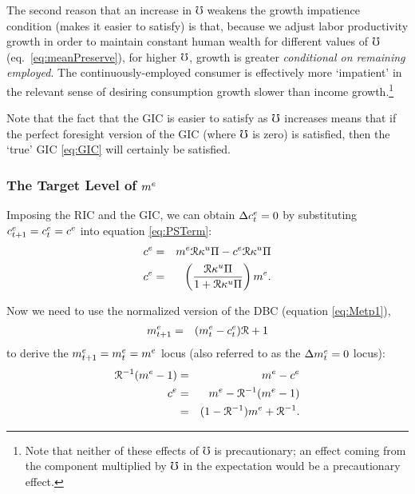 \documentclass{handout}
\begin{document}
The second reason that an increase in $\mho$ weakens the growth impatience condition (makes it 
easier to satisfy) is that, because we adjust labor productivity growth in
order to maintain constant human wealth for different values of
$\mho$ (eq.\ \eqref{eq:meanPreserve}), for higher
$\mho$, growth is greater {\it conditional on
  remaining employed}. The continuously-employed consumer is effectively
more `impatient' in the relevant sense of desiring consumption growth
slower than income growth.\footnote{Note that neither of these effects of $\mho$
  is precautionary; an effect coming from the component
  multiplied by $\mho$ in the expectation would be a
  precautionary effect.}

Note that the fact that the GIC is easier to satisfy as $\mho$ increases
means that if the perfect foresight version of the GIC (where $\mho$ is
zero) is satisfied, then the `true' GIC \eqref{eq:GIC} will certainly be satisfied.

\subsubsection{The Target Level of $m^{e}$}
\renewcommand{\tSS}{\null}
Imposing the RIC and the GIC, we can obtain $\Delta c^{e}_{t} = 0$ by substituting
$c^{e}_{t+1}=c^{e}_{t}=c^{e}$ into equation \eqref{eq:PSTerm}:
\begin{eqnarray}
  \cRatE_{\tSS} & = & \mRatE_{\tSS} \Rnorm\MPCU\straight - \cRatE_{\tSS} \Rnorm\MPCU\straight
\\  \cRatE_{\tSS} & = & \left(\frac{\Rnorm\MPCU\straight}{1+\Rnorm\MPCU\straight}\right)\mRatE
. \label{eq:DceEq0} \label{eq:cDelEqZero}
\end{eqnarray}


Now we need to use the normalized version of the DBC (equation \eqref{eq:Metp1}),
\begin{eqnarray}
        m^{e}_{t+1} & = & (m^{e}_{t}-c^{e}_{t})\mathcal{R}+1 \label{eq:metp1}
\end{eqnarray}
to derive the $\mRatE_{t+1}=\mRatE_{t}=\mRatE_{\tSS}$ locus (also referred
to as the $\Delta m^{e}_{t} = 0$ locus): 
\begin{eqnarray}
      \Rnorm^{-1}(\mRatE_{\tSS}-1) & = & \mRatE_{\tSS}-\cRatE_{\tSS}
\\      \cRatE_{\tSS} & = & \mRatE_{\tSS}-\Rnorm^{-1}(\mRatE_{\tSS}-1)
\\       & = & (1-\Rnorm^{-1})\mRatE_{\tSS}+\Rnorm^{-1}. \label{eq:mDelEqZero}
\end{eqnarray}
\end{document}

